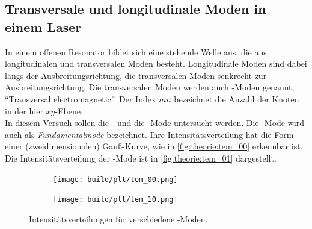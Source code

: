 \subsection{Transversale und longitudinale Moden in einem Laser}
\label{sec:moden}

    In einem offenen Resonator bildet sich eine stehende Welle aus,
    die aus longitudinalen und transversalen Moden besteht.
    Longitudinale Moden sind dabei längs der Ausbreitungsrichtung,
    die transversalen Moden senkrecht zur Ausbreitungsrichtung.
    Die transversalen Moden werden auch -Moden genannt,
    \enquote{Transversal electromagnetic}.
    Der Index $mn$ bezeichnet die Anzahl der Knoten in der hier $xy$-Ebene.\\
    In diesem Versuch sollen die - und die -Mode untersucht werden.
    Die -Mode wird auch als \textit{Fundamentalmode} bezeichnet.
    Ihre Intensitätsverteilung hat die Form einer (zweidimensionalen) Gauß-Kurve,
    wie in \autoref{fig:theorie:tem_00} erkennbar ist.
    Die Intensitätsverteilung der -Mode ist in \autoref{fig:theorie:tem_01} dargestellt.

    \begin{figure}
    \centering
    \begin{subfigure}{.5\textwidth}
        \centering
        \texttt{[image: build/plt/tem\_00.png]}
        \caption{}
        \label{fig:theorie:tem_00}
    \end{subfigure}%
    \begin{subfigure}{.5\textwidth}
        \centering
        \texttt{[image: build/plt/tem\_10.png]}
        \caption{}
        \label{fig:theorie:tem_01}
    \end{subfigure}
    \caption{Intensitätsverteilungen für verschiedene \TEM{}-Moden.}
    \label{fig:theorie:tem}
    \end{figure}
